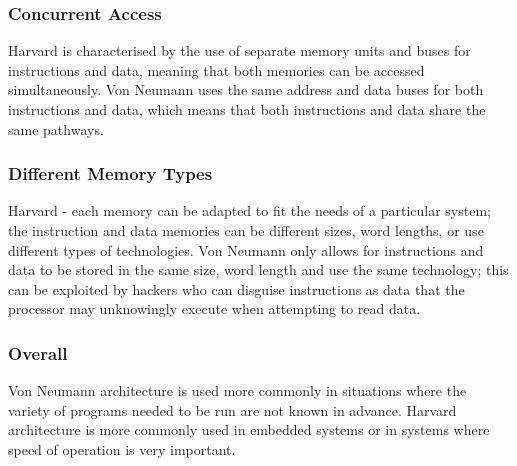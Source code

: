 \documentclass[a4paper,11pt, twocolumn]{article}
\begin{document}
\subsubsection{Concurrent Access}
Harvard is characterised by the use of separate memory units and buses for instructions and data, meaning that both memories can be accessed simultaneously. Von Neumann uses the same address and data buses for both instructions and data, which means that both instructions and data share the same pathways.
\subsubsection{Different Memory Types}
Harvard - each memory can be adapted to fit the needs of a particular system; the instruction and data memories can be different sizes, word lengths, or use different types of technologies. Von Neumann only allows for instructions and data to be stored in the same size, word length and use the same technology; this can be exploited by hackers who can disguise instructions as data that the processor may unknowingly execute when attempting to read data.
\subsubsection{Overall}
Von Neumann architecture is used more commonly in situations where the variety of programs needed to be run are not known in advance. Harvard architecture is more commonly used in embedded systems or in systems where speed of operation is very important. 
\end{document}
